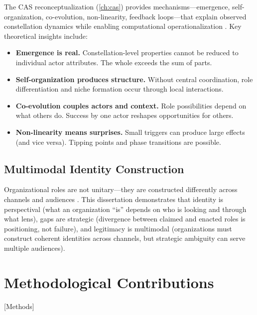 \documentclass[../main.tex]{subfiles}
\begin{document}
The CAS reconceptualization (\cref{ch:cas}) provides mechanisms---emergence, self-organization, co-evolution, non-linearity, feedback loops---that explain observed constellation dynamics while enabling computational operationalization . Key theoretical insights include:

\begin{itemize}[leftmargin=*, itemsep=0.3em]
\item \textbf{Emergence is real.} Constellation-level properties cannot be reduced to individual actor attributes. The whole exceeds the sum of parts.
\item \textbf{Self-organization produces structure.} Without central coordination, role differentiation and niche formation occur through local interactions.
\item \textbf{Co-evolution couples actors and context.} Role possibilities depend on what others do. Success by one actor reshapes opportunities for others.
\item \textbf{Non-linearity means surprises.} Small triggers can produce large effects (and vice versa). Tipping points and phase transitions are possible.
\end{itemize}

\subsection{Multimodal Identity Construction}

Organizational roles are not unitary---they are constructed differently across channels and audiences \cite{albert1985organizational,gioia2013organizational}. This dissertation demonstrates that identity is perspectival (what an organization ``is'' depends on who is looking and through what lens), gaps are strategic (divergence between claimed and enacted roles is positioning, not failure), and legitimacy is multimodal (organizations must construct coherent identities across channels, but strategic ambiguity can serve multiple audiences).

\section{Methodological Contributions}[Methods]
\end{document}
